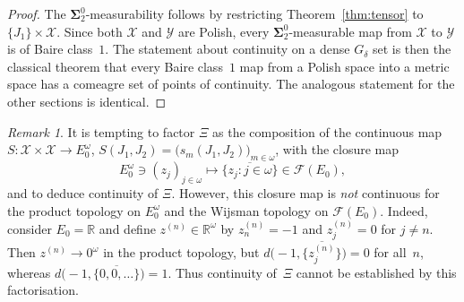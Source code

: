 \documentclass[12pt]{amsart}
\theoremstyle{plain}
\theoremstyle{definition}
\theoremstyle{remark}
\newtheorem{remark}[theorem]{Remark}
\DeclareMathOperator{\FBL}{FBL}
\DeclareMathOperator{\Subl}{Subl}
\DeclareMathOperator{\Ideal}{Ideal}
\newcommand{\R}{\mathbb{R}}
\begin{document}
\begin{proof}
The $\boldsymbol{\Sigma}^0_2$-measurability follows by restricting
Theorem~\ref{thm:tensor} to $\{J_1\} \times \mathscr{X}$.
Since both $\mathscr{X}$ and $\mathscr{Y}$ are Polish, every
$\boldsymbol{\Sigma}^0_2$-measurable map from $\mathscr{X}$ to
$\mathscr{Y}$ is of Baire class~$1$.
The statement about continuity on a dense $G_\delta$ set is then the
classical theorem that every Baire class~$1$ map from a Polish space
into a metric space has a comeagre set of points of continuity.
The analogous statement for the other sections is identical.
\end{proof}

\begin{remark}\label{rem:closure-not-cont}
It is tempting to factor $\Xi$ as the composition of the continuous map
$S \colon \mathscr{X} \times \mathscr{X} \to E_0^\omega$,
$S(J_1, J_2) = \bigl(s_m(J_1, J_2)\bigr)_{m \in \omega}$, with the closure map
\[
    E_0^\omega \ni (z_j)_{j \in \omega}
    \longmapsto \overline{\{z_j \colon j \in \omega\}} \in \mathcal{F}(E_0),
\]
and to deduce continuity of $\Xi$.  However, this closure map is
\emph{not} continuous for the product topology on $E_0^\omega$ and the Wijsman
topology on $\mathcal{F}(E_0)$.  Indeed, consider $E_0 = \R$ and define
$z^{(n)} \in \R^\omega$ by $z^{(n)}_n = -1$ and $z^{(n)}_j = 0$ for $j \ne n$.
Then $z^{(n)} \to 0^\omega$ in the product topology, but
$d\bigl(-1, \overline{\{z^{(n)}_j\}}\bigr) = 0$ for all~$n$, whereas
$d\bigl(-1, \overline{\{0, 0, \ldots\}}\bigr) = 1$.  Thus continuity of~$\Xi$
cannot be established by this factorisation.
\end{remark}



\end{document}
